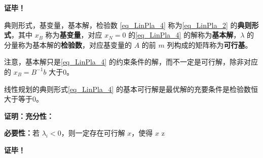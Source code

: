 \textbf{证毕！}

\begin{definition}{典则形式，基变量，基本解，检验数}
\autoref{eq_LinPla_4} 称为\autoref{eq_LinPla_2} 的\textbf{典则形式}，其中 $x_B$ 称为\textbf{基变量}，对应 $x_N=0$ 的\autoref{eq_LinPla_4} 的解称为\textbf{基本解}，$\lambda$ 的分量称为基本解的\textbf{检验数}，对应基变量的 $A$ 的前 $m$ 列构成的矩阵称为\textbf{可行基}。 
\end{definition}
注意，基本解只是\autoref{eq_LinPla_4} 的约束条件的解，而不一定是可行解，除非对应的 $x_B=B^{-1}b$ 大于0。 
\begin{corollary}{}
线性规划的典则形式\autoref{eq_LinPla_4} 的基本可行解是最优解的充要条件是检验数恒大于等于0。
\end{corollary}
\textbf{证明：}\textbf{充分性：}


\textbf{必要性：}若 $\lambda_i<0$，则一定存在可行解 $x$，使得 $x$ z


\textbf{证毕！}




